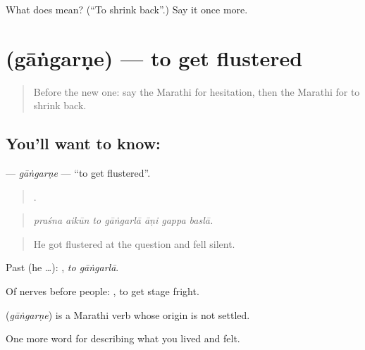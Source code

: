 \begin{tcolorbox}[breakable,colback=teal!4,colframe=teal!35!black,title={Before you move on}]
What does  mean? (\textquotedblleft{}To shrink back\textquotedblright{}.) Say it once more.
\end{tcolorbox}
\section[\texorpdfstring{\mr{गांगरणे} (gāṅgarṇe)}{गांगरणे (gāṅgarṇe)}]{ (gāṅgarṇe) — to get flustered}

\label{lesson:MR-C456-gangarne}



\begin{quote}
Before the new one: say the Marathi for hesitation, then the Marathi for to shrink back.
\end{quote}

\subsection*{You'll want to know: }
\textbf{} — \emph{gāṅgarṇe} — \textquotedblleft{}to get flustered\textquotedblright{}.

\begin{quote}
      .
\end{quote}

\begin{quote}
\emph{praśna aikūn to gāṅgarlā āṇi gappa baslā.}
\end{quote}

\begin{quote}
He got flustered at the question and fell silent.
\end{quote}

Past (he …):  , \emph{to gāṅgarlā}.

Of nerves before people:  , to get stage fright.

\begin{cousinweb}
\textbf{} (\emph{gāṅgarṇe}) is a Marathi verb whose origin is not settled.
\end{cousinweb}

\begin{grammarlens}[title={What you've built}]
One more word for describing what you lived and felt.
\end{grammarlens}

